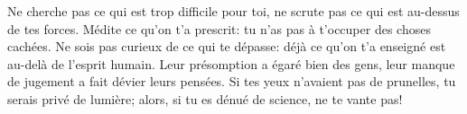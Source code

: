 Ne cherche pas ce qui est trop difficile pour toi,
	ne scrute pas ce qui est au-dessus de tes forces.
Médite ce qu’on t’a prescrit:
	tu n’as pas à t’occuper des choses cachées.
Ne sois pas curieux de ce qui te dépasse:
	déjà ce qu’on t’a enseigné est au-delà de l’esprit humain.
Leur présomption a égaré bien des gens,
	leur manque de jugement a fait dévier leurs pensées.
Si tes yeux n’avaient pas de prunelles, tu serais privé de lumière;
	alors, si tu es dénué de science, ne te vante pas!
